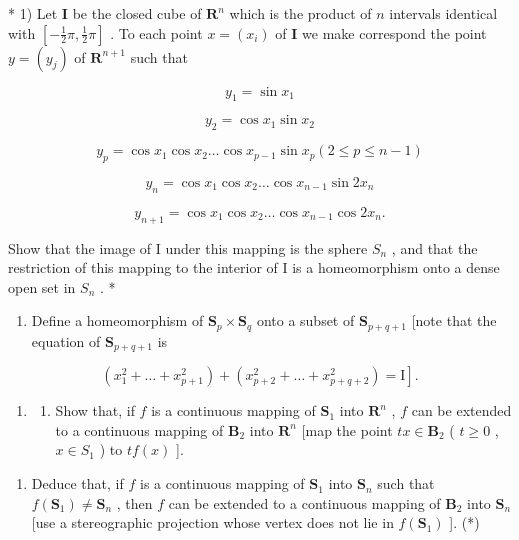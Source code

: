 \ExerciseSection

* 1) Let \(\mathbf{I}\) be the closed cube of \(\mathbf{R}^n\) which is the product of \(n\) intervals identical with \([-\frac{1}{2}\pi, \frac{1}{2}\pi]\) . To each point \(x = (x_i)\) of \(\mathbf{I}\) we make correspond the point \(y = (y_j)\) of \(\mathbf{R}^{n+1}\) such that

\[
y _ {1} = \sin x _ {1}
\]

\[
{y _ {2}} {= \cos x _ {1} \sin x _ {2}}
\]

\[
y _ {p} = \cos x _ {1} \cos x _ {2} \dots \cos x _ {p - 1} \sin x _ {p} (2 \leqslant p \leqslant n - 1)
\]

\[
y _ {n} = \cos x _ {1} \cos x _ {2} \dots \cos x _ {n - 1} \sin 2 x _ {n}
\]

\[
y _ {n + 1} = \cos x _ {1} \cos x _ {2} \dots \cos x _ {n - 1} \cos 2 x _ {n}.
\]

Show that the image of I under this mapping is the sphere \(S_{n}\) , and that the restriction of this mapping to the interior of I is a homeomorphism onto a dense open set in \(S_{n}\) . *

\begin{enumerate}
\def\labelenumi{\arabic{enumi})}
\setcounter{enumi}{1}
\tightlist
\item
  Define a homeomorphism of \(\mathbf{S}_p \times \mathbf{S}_q\) onto a subset of \(\mathbf{S}_{p + q + 1}\) {[}note that the equation of \(\mathbf{S}_{p + q + 1}\) is
\end{enumerate}

\[
\left. \left(x _ {1} ^ {2} + \dots + x _ {p + 1} ^ {2}\right) + \left(x _ {p + 2} ^ {2} + \dots + x _ {p + q + 2} ^ {2}\right) = \mathrm{I} \right].
\]

\begin{enumerate}
\def\labelenumi{\arabic{enumi})}
\setcounter{enumi}{2}
\tightlist
\item
  \begin{enumerate}
  \def\labelenumii{\alph{enumii})}
  \tightlist
  \item
    Show that, if \(f\) is a continuous mapping of \(\mathbf{S}_1\) into \(\mathbf{R}^n\) , \(f\) can be extended to a continuous mapping of \(\mathbf{B}_2\) into \(\mathbf{R}^n\) {[}map the point \(tx \in \mathbf{B}_2\) ( \(t \geqslant 0\) , \(x \in S_1\) ) to \(tf(x)\) {]}.
  \end{enumerate}
\end{enumerate}

\begin{enumerate}
\def\labelenumi{\alph{enumi})}
\setcounter{enumi}{1}
\tightlist
\item
  Deduce that, if \(f\) is a continuous mapping of \(\mathbf{S}_1\) into \(\mathbf{S}_n\) such that \(f(\mathbf{S}_1) \neq \mathbf{S}_n\) , then \(f\) can be extended to a continuous mapping of \(\mathbf{B}_2\) into \(\mathbf{S}_n\) {[}use a stereographic projection whose vertex does not lie in \(f(\mathbf{S}_1)\) {]}. (*)
\end{enumerate}

